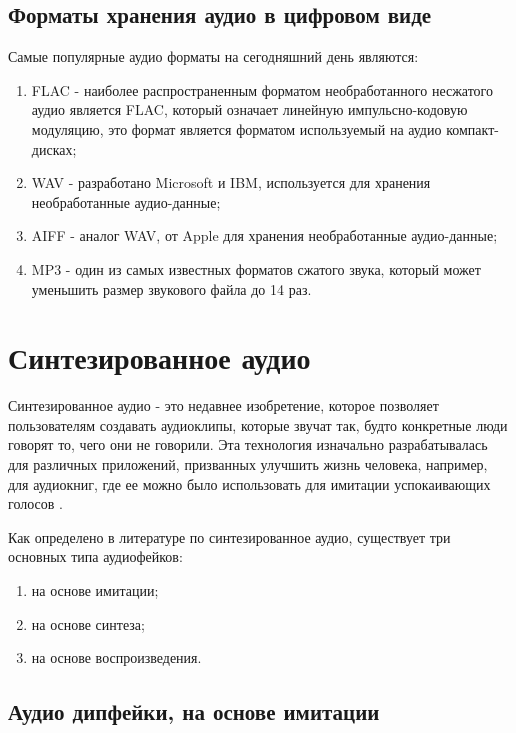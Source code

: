 \subsection{Форматы хранения аудио в цифровом виде}

Самые популярные аудио форматы на сегодняшний день являются:

\begin{enumerate}
    \item FLAC - наиболее распространенным форматом необработанного несжатого аудио является FLAC, который означает линейную импульсно-кодовую модуляцию, это формат является форматом используемый на аудио компакт-дисках;
    \item WAV - разработано Microsoft и IBM, используется для хранения необработанные аудио-данные;
    \item AIFF - аналог WAV, от Apple для хранения необработанные аудио-данные;
    \item MP3 - один из самых известных форматов сжатого звука, который может уменьшить размер звукового файла до 14 раз.
\end{enumerate}


\section{Синтезированное аудио}

Синтезированное аудио - это недавнее изобретение, которое позволяет пользователям создавать аудиоклипы, которые звучат так, будто конкретные люди говорят то, чего они не говорили. Эта технология изначально разрабатывалась для различных приложений, призванных улучшить жизнь человека, например, для аудиокниг, где ее можно было использовать для имитации успокаивающих голосов \cite{types-of-ad}.


Как определено в литературе по синтезированное аудио, существует три основных типа аудиофейков:

\begin{enumerate}
    \item на основе имитации;
    \item на основе синтеза;
    \item на основе воспроизведения.
\end{enumerate}

\subsection{Аудио дипфейки, на основе имитации}

